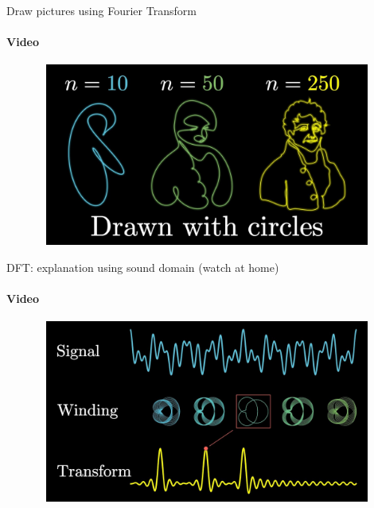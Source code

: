 \documentclass[aspectratio=169]{beamer}
\begin{document}
\begin{frame}[t]{Draw pictures using Fourier Transform}
    \framesubtitle{Video}
    \vspace{-0.6cm}
    \begin{figure}[H]
        \href{https://youtu.be/r6sGWTCMz2k}{
            \centering\includegraphics[height=6cm,width=1\textwidth,keepaspectratio]{drawn_with_circles.jpg}}
        \label{fig:drawn_with_circles.jpg}
    \end{figure}
\end{frame}

\begin{frame}[t]{DFT: explanation using sound domain (watch at home)}
    \framesubtitle{Video}
    \vspace{-0.6cm}
    \begin{figure}[H]
        \href{https://youtu.be/spUNpyF58BY}{
            \centering\includegraphics[height=6cm,width=1\textwidth,keepaspectratio]{fourier_sound.jpg}}
        \label{fig:fourier_sound.jpg}
    \end{figure}
\end{frame}
\end{document}
